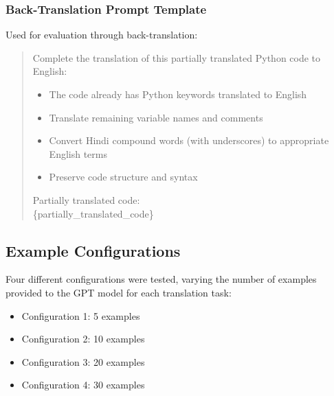 \documentclass[11pt,a4paper]{article}
\begin{document}
\subsubsection{Back-Translation Prompt Template}
Used for evaluation through back-translation:
\begin{quote}
Complete the translation of this partially translated Python code to English:
\begin{itemize}
\item The code already has Python keywords translated to English
\item Translate remaining variable names and comments
\item Convert Hindi compound words (with underscores) to appropriate English terms
\item Preserve code structure and syntax
\end{itemize}

Partially translated code:\\
\{partially\_translated\_code\}
\end{quote}

\subsection{Example Configurations}
Four different configurations were tested, varying the number of examples provided to the GPT model for each translation task:

\begin{itemize}
    \item Configuration 1: 5 examples
    \item Configuration 2: 10 examples
    \item Configuration 3: 20 examples
    \item Configuration 4: 30 examples
\end{itemize}




\end{document}
